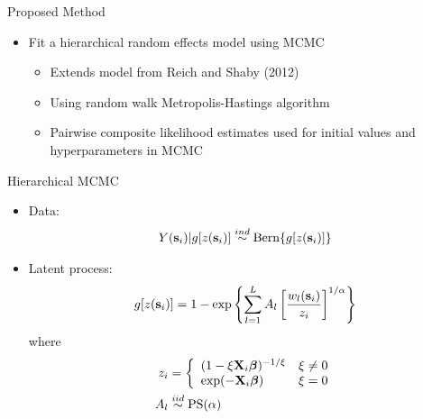 \documentclass{beamer}
\begin{document}
\begin{frame}{Proposed Method}
  \begin{itemize} \setlength{\itemsep}{1em}
    \item Fit a hierarchical random effects model using MCMC
    \begin{itemize} \setlength{\itemsep}{0.5em}
      \item Extends model from Reich and Shaby (2012)
      \item Using random walk Metropolis-Hastings algorithm
      \item Pairwise composite likelihood estimates used for initial values and hyperparameters in MCMC
    \end{itemize}
  \end{itemize}
\end{frame}


\begin{frame}{Hierarchical MCMC}
  \begin{itemize} \setlength{\itemsep}{1em}
    \item Data:
    \begin{align*}
      Y(\mbox{\bf s}_i) | g[z(\mbox{\bf s}_i)] \stackrel{ind}{\sim} \text{Bern}\{g[z(\mbox{\bf s}_i)]\}
    \end{align*}
    \item Latent process:
    \begin{align*}
      g[z(\mbox{\bf s}_i)] &= 1 - \exp\left\{ \sum_{l = 1}^L A_l \left[\frac{ w_l (\mbox{\bf s}_i) }{z_i} \right]^{1 / \alpha} \right\}\\
    \end{align*} \vspace{-0.5em}
    where
    \begin{align*}
      z_i &= \left\{ \begin{array}{ll}
        (1 - \xi \mbox{\bf X}_i \mbox{\boldmath $\beta$})^{-1 / \xi} & \xi \neq 0 \\
        \exp(-\mbox{\bf X}_i \mbox{\boldmath $\beta$}) & \xi = 0
        \end{array} \right.\\
      A_l &\stackrel{iid}{\sim} \text{PS}(\alpha)
    \end{align*}
  \end{itemize}
\end{frame}
\end{document}
